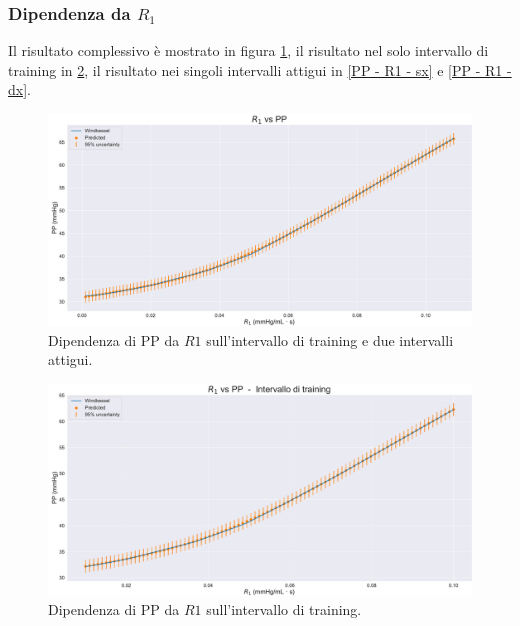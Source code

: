 \newpage
\subsubsection{Dipendenza da $R_1$}
Il risultato complessivo è mostrato in figura \ref{PP - R1 - full}, il risultato nel solo intervallo di training in \ref{PP - R1 - training}, il risultato nei singoli intervalli attigui in \ref{PP - R1 - sx} e \ref{PP - R1 - dx}.

\vspace{1cm}

\begin{figure}[!htb]
    \centering
    \includegraphics[width=1\textwidth]{images/Training (risultati)/PP/PP - R1 - full.pdf}
    \caption{Dipendenza di PP da $R1$ sull'intervallo di training e due intervalli attigui.}
    \label{PP - R1 - full}
\end{figure}

\vspace{0.32cm}

\begin{figure}[!htb]
    \centering
    \includegraphics[width=1\textwidth]{images/Training (risultati)/PP/PP - R1 - training.pdf}
    \caption{Dipendenza di PP da $R1$ sull'intervallo di training.}
    \label{PP - R1 - training}
\end{figure}

